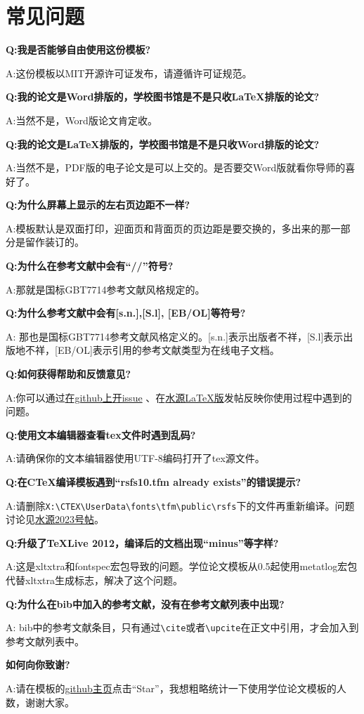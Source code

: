 
\chapter{常见问题}
\label{chap:faq}

{\bfseries{}Q:我是否能够自由使用这份模板?}

A:这份模板以MIT开源许可证发布，请遵循许可证规范。

{\bfseries{}Q:我的论文是Word排版的，学校图书馆是不是只收{\LaTeX}排版的论文?}

A:当然不是，Word版论文肯定收。

{\bfseries{}Q:我的论文是{\LaTeX}排版的，学校图书馆是不是只收Word排版的论文?}

A:当然不是，PDF版的电子论文是可以上交的。是否要交Word版就看你导师的喜好了。

{\bfseries{}Q:为什么屏幕上显示的左右页边距不一样?}

A:模板默认是双面打印，迎面页和背面页的页边距是要交换的，多出来的那一部分是留作装订的。

{\bfseries{}Q:为什么在参考文献中会有``//''符号?}

A:那就是国标GBT7714参考文献风格规定的。

{\bfseries{}Q:为什么参考文献中会有[s.n.],[S.l], [EB/OL]等符号?}

A: 那也是国标GBT7714参考文献风格定义的。[s.n.]表示出版者不祥，[S.l]表示出版地不祥，[EB/OL]表示引用的参考文献类型为在线电子文档。

{\bfseries{}Q:如何获得帮助和反馈意见?}

A:你可以通过\href{https://github.com/weijianwen/sjtu-thesis-template-latex/issues}{在github上开issue}
、在\href{https://bbs.sjtu.edu.cn/bbsdoc?board=TeX_LaTeX}{水源LaTeX版}发帖反映你使用过程中遇到的问题。

{\bfseries{}Q:使用文本编辑器查看tex文件时遇到乱码?}

A:请确保你的文本编辑器使用UTF-8编码打开了tex源文件。

{\bfseries{}Q:在CTeX编译模板遇到``rsfs10.tfm already exists''的错误提示?}

A:请删除\verb+X:\CTEX\UserData\fonts\tfm\public\rsfs+下的文件再重新编译。问题讨论见\href{https://bbs.sjtu.edu.cn/bbstcon,board,TeX_LaTeX,reid,1352982719.html}{水源2023号帖}。

{\bfseries{}Q:升级了TeXLive 2012，编译后的文档出现``minus''等字样?}

A:这是xltxtra和fontspec宏包导致的问题。学位论文模板从0.5起使用metatlog宏包代替xltxtra生成{\XeTeX}标志，解决了这个问题。

{\bfseries{}Q:为什么在bib中加入的参考文献，没有在参考文献列表中出现?}

A: bib中的参考文献条目，只有通过\verb+\cite+或者\verb+\upcite+在正文中引用，才会加入到参考文献列表中。

{\bfseries{}如何向你致谢?}

A:请在模板的\href{https://github.com/weijianwen/sjtu-thesis-template-latex}{github主页}点击``Star''，我想粗略统计一下使用学位论文模板的人数，谢谢大家。

